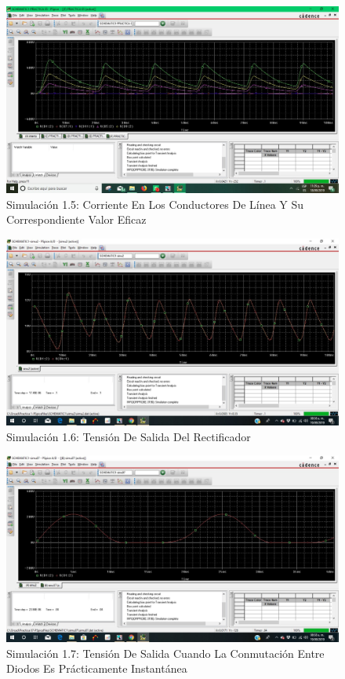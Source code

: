 \documentclass[10pt,a4paper]{article}
\begin{document}
\begin{figure}[hbtp]
\centering
\includegraphics[scale=0.3]{5.jpeg}
\caption{Simulación 1.5: Corriente En Los Conductores De Línea Y Su Correspondiente Valor Eficaz}
\end{figure}
\begin{figure}[hbtp]
\centering
\includegraphics[scale=0.3]{6.jpeg}
\caption{Simulación 1.6: Tensión De Salida Del Rectificador}
\end{figure}
 \begin{figure}[hbtp]
\centering
\includegraphics[scale=0.3]{7.jpeg}
\caption{Simulación 1.7: Tensión De Salida Cuando La Conmutación Entre Diodos Es Prácticamente Instantánea}
\end{figure}
\end{document}
